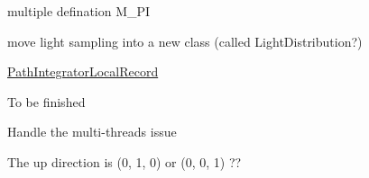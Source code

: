 \begin{DoxyRefList}
\item[Member \mbox{\hyperlink{_common_8h_ae71449b1cc6e6250b91f539153a7a0d3}{M\+\_\+\+PI}} ]\label{todo__todo000007}%
%
multiple defination M\+\_\+\+PI  
\item[Member \mbox{\hyperlink{class_path_integrator_ab4d7071e1c8e56d42a51a64f624bcaf6}{Path\+Integrator\+::choose\+One\+Light}} (std\+::shared\+\_\+ptr$<$ Scene $>$ scene, const Intersection \&its, const \mbox{\hyperlink{struct_ray}{Ray}} \&ray, double light\+Sample)]\label{todo__todo000013}%
%
move light sampling into a new class (called Light\+Distribution?)  
\item[Class \mbox{\hyperlink{struct_path_integrator_local_record}{Path\+Integrator\+Local\+Record}} ]\label{todo__todo000012}%
%
\mbox{\hyperlink{struct_path_integrator_local_record}{Path\+Integrator\+Local\+Record}}  
\item[Class \mbox{\hyperlink{class_r_g_b_spectrum}{RGBSpectrum}} ]\label{todo__todo000001}%
%
To be finished  
\item[Class \mbox{\hyperlink{class_sampler}{Sampler}} ]\label{todo__todo000015}%
%
Handle the multi-\/threads issue  
\item[File \mbox{\hyperlink{_warp_8h}{Warp.h}} ]\label{todo__todo000010}%
%
The up direction is (0, 1, 0) or (0, 0, 1) ?? 
\end{DoxyRefList}